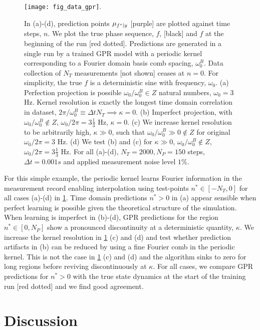 \documentclass[pra, reprint]{revtex4-1}
\begin{document}
\begin{figure}
    \texttt{[image: fig\_data\_gpr]}. 
    \caption{\label{fig:main:fig_data_gpr} In (a)-(d), prediction points $\mu_{f^*|y}$ [purple] are plotted against time steps, $n$. We plot the true phase sequence,  $f$, [black] and  $f$ at the beginning of the run [red dotted]. Predictions are generated in a single run by a trained GPR model with a periodic kernel corresponding to a Fourier domain basis comb spacing, $\omega_0^B$. Data collection of $N_T$ measurements [not shown] ceases at $n=0$. For simplicity, the true $f$ is a deterministic sine with frequency, $\omega_0$. (a) Perfection projection is possible $\omega_0 / \omega_0^B \in Z$ natural numbers, $\omega_0 = 3$ Hz. Kernel resolution is exactly the longest time domain correlation in dataset, $2 \pi / \omega_0^B \equiv \Delta t N_T \implies \kappa = 0$.   (b) Imperfect projection, with $\omega_0 / \omega_0^B \notin Z$, $\omega_0 / 2 \pi = 3 \frac{1}{3}$ Hz, $\kappa=0$. (c) We increase kernel resolution to be arbitrarily high, $\kappa \gg 0 $, such that $\omega_0 / \omega_0^B \gg 0 \notin Z $ for original $ \omega_0 / 2 \pi = 3$ Hz. (d) We test (b) and (c) for $\kappa \gg0$, $ \omega_0 / \omega_0^B \notin Z$, $\omega_0 / 2 \pi = 3 \frac{1}{3}$ Hz. For all (a)-(d), $N_T = 2000, N_P = 150$ steps, $\Delta t = 0.001s$ and applied measurement noise level $1\%$.} 
\end{figure}
For this simple example, the periodic kernel learns Fourier information in the measurement record enabling interpolation using test-points $n^* \in [-N_T, 0]$ for all cases (a)-(d) in \cref{fig:main:fig_data_gpr}. Time domain predictions $n^* >0$  in (a) appear sensible when perfect learning is possible given the theoretical structure of the simulation. When learning is imperfect in (b)-(d), GPR predictions for the region  $n^* \in [0, N_P]$ show a pronounced discontinuity at a deterministic quantity, $\kappa$.  We increase the kernel resolution in \cref{fig:main:fig_data_gpr} (c) and (d) and test whether prediction artifacts in (b) can be reduced by using a fine Fourier comb in the periodic kernel. This is not the case in \cref{fig:main:fig_data_gpr} (c) and (d) and the algorithm sinks to zero for long regions before reviving discontinuously at $\kappa$. For all cases, we compare GPR predictions for $n^*>0$ with the true state dynamics at the start of the training run [red dotted] and we find good agreement. 

\section{Discussion} \label{sec:main:discussion}
\end{document}
